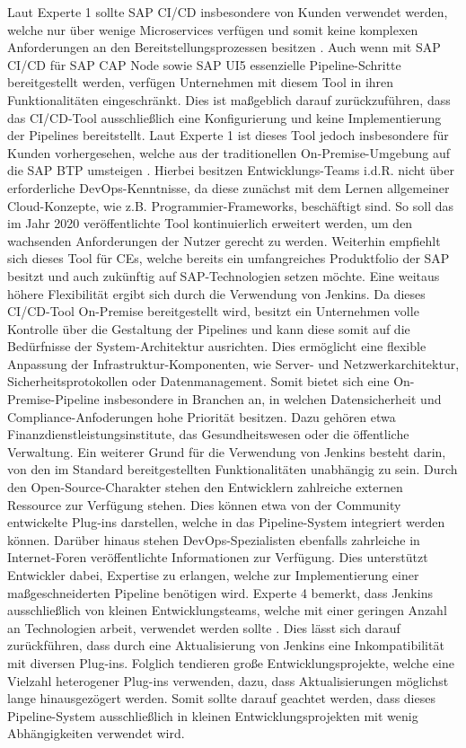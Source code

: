 Laut Experte 1 sollte SAP CI/CD insbesondere von Kunden verwendet werden, welche nur über wenige Microservices verfügen und somit keine komplexen Anforderungen an den Bereitstellungsprozessen besitzen \cite[Z. 58 ff.]{ProductOwnerSAPBTPProd&Infra.}. Auch wenn mit SAP CI/CD für SAP CAP Node sowie SAP UI5 essenzielle Pipeline-Schritte bereitgestellt werden, verfügen Unternehmen mit diesem Tool in ihren Funktionalitäten eingeschränkt. Dies ist maßgeblich darauf zurückzuführen, dass das CI/CD-Tool ausschließlich eine Konfigurierung und keine Implementierung der Pipelines bereitstellt. Laut Experte 1 ist dieses Tool jedoch insbesondere für Kunden vorhergesehen, welche aus der traditionellen On-Premise-Umgebung auf die SAP BTP umsteigen \cite[Z. 58 ff.]{ProductOwnerSAPBTPProd&Infra.}. Hierbei besitzen Entwicklungs-Teams i.d.R. nicht über erforderliche DevOps-Kenntnisse, da diese zunächst mit dem Lernen allgemeiner Cloud-Konzepte, wie z.B. Programmier-Frameworks, beschäftigt sind. So soll das im Jahr 2020 veröffentlichte Tool kontinuierlich erweitert werden, um den wachsenden Anforderungen der Nutzer gerecht zu werden. Weiterhin empfiehlt sich dieses Tool für CEs, welche bereits ein umfangreiches Produktfolio der SAP besitzt und auch zukünftig auf SAP-Technologien setzen möchte. Eine weitaus höhere Flexibilität ergibt sich durch die Verwendung von Jenkins. Da dieses CI/CD-Tool On-Premise bereitgestellt wird, besitzt ein Unternehmen volle Kontrolle über die Gestaltung der Pipelines und kann diese somit auf die Bedürfnisse der System-Architektur ausrichten. Dies ermöglicht eine flexible Anpassung der Infrastruktur-Komponenten, wie Server- und Netzwerkarchitektur, Sicherheitsprotokollen oder Datenmanagement. Somit bietet sich eine On-Premise-Pipeline insbesondere in Branchen an, in welchen Datensicherheit und Compliance-Anfoderungen hohe Priorität besitzen. Dazu gehören etwa Finanzdienstleistungsinstitute, das Gesundheitswesen oder die öffentliche Verwaltung. Ein weiterer Grund für die Verwendung von Jenkins besteht darin, von den im Standard bereitgestellten Funktionalitäten unabhängig zu sein. Durch den Open-Source-Charakter stehen den Entwicklern zahlreiche externen Ressource zur Verfügung stehen. Dies können etwa von der Community entwickelte Plug-ins darstellen, welche in das Pipeline-System integriert werden können. Darüber hinaus stehen DevOps-Spezialisten ebenfalls zahrleiche in Internet-Foren veröffentlichte Informationen zur Verfügung. Dies unterstützt Entwickler dabei, Expertise zu erlangen, welche zur Implementierung einer maßgeschneiderten Pipeline benötigen wird. Experte 4 bemerkt, dass Jenkins ausschließlich von kleinen Entwicklungsteams, welche mit einer geringen Anzahl an Technologien arbeit, verwendet werden sollte \cite[Z. 58 ff.]{TestDeveloperSAPHyperspaceAdoption&Onboarding.}. Dies lässt sich darauf zurückführen, dass durch eine Aktualisierung von Jenkins eine Inkompatibilität mit diversen Plug-ins. Folglich tendieren große Entwicklungsprojekte, welche eine Vielzahl heterogener Plug-ins verwenden, dazu, dass Aktualisierungen möglichst lange hinausgezögert werden. Somit sollte darauf geachtet werden, dass dieses Pipeline-System ausschließlich in kleinen Entwicklungsprojekten mit wenig Abhängigkeiten verwendet wird.  
